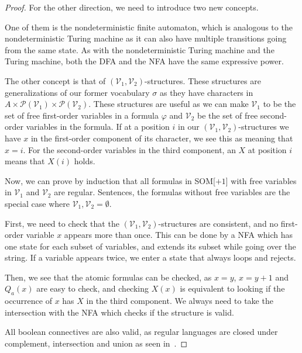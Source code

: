 \begin{proof}
    \vspace{5mm}

    For the other direction, we need to introduce two new concepts.

    One of them is the nondeterministic finite automaton, which is analogous to the nondeterministic Turing machine as it can also have multiple transitions going from the same state.
    As with the nondeterministic Turing machine and the Turing machine, both the DFA and the NFA have the same expressive power.

    The other concept is that of $(\mathcal{V}_1, \mathcal{V}_2)$-structures.
    These structures are generalizations of our former vocabulary $\sigma$ as they have characters in $A \times \mathcal{P}(\mathcal{V}_1)\times \mathcal{P}(\mathcal{V}_2)$.
    These structures are useful as we can make $\mathcal{V}_1$ to be the set of free first-order variables in a formula $\varphi$ and $\mathcal{V}_2$ be the set of free second-order variables in the formula.
    If at a position $i$ in our $(\mathcal{V}_1, \mathcal{V}_2)$-structures we have $x$ in the first-order component of its character, we see this as meaning that $x = i$.
    For the second-order variables in the third component, an $X$ at position $i$ means that $X(i)$ holds.

    Now, we can prove by induction that all formulas in SOM[$+1$] with free variables in $\mathcal{V}_1$ and $\mathcal{V}_2$ are regular.
    Sentences, the formulas without free variables are the special case where $\mathcal{V}_1, \mathcal{V}_2 = \emptyset$.

    First, we need to check that the $(\mathcal{V}_1, \mathcal{V}_2)$-structures are consistent, and no first-order variable $x$ appears more than once.
    This can be done by a NFA which has one state for each subset of variables, and extends its subset while going over the string.
    If a variable appears twice, we enter a state that always loops and rejects.

    Then, we see that the atomic formulas can be checked, as $x = y$, $x = y + 1$ and $Q_a(x)$ are easy to check, and checking $X(x)$ is equivalent to looking if the occurrence of $x$ has $X$ in the third component.
    We always need to take the intersection with the NFA which checks if the structure is valid.

    All boolean connectives are also valid, as regular languages are closed under complement, intersection and union as seen in~\cite{theory-cs}.


\end{proof}
